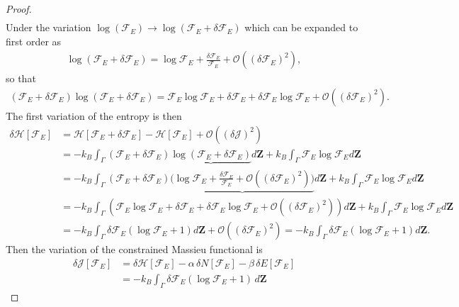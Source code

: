 \documentclass[12pt,a4paper]{article}
\numberwithin{equation}{section}
\begin{document}
\begin{proof}
\begin{align}
\end{align}
Under the variation $\log (\mathcal{F}_{E})\to\log(\mathcal{F}_{E}+\delta \mathcal{F}_{E})$ which can be expanded to first order as
\begin{align}
  \log(\mathcal{F}_{E}+\delta \mathcal{F}_{E})=\log \mathcal{F}_{E}+ \frac{\delta \mathcal{F}_{E}}{\mathcal{F}_{E}}+\mathcal{O}((\delta \mathcal{F}_{E})^{2}),
\end{align}
so that
\begin{align}
(\mathcal{F}_{E}+\delta \mathcal{F}_{E})\log(\mathcal{F}_{E}+\delta \mathcal{F}_{E})=\mathcal{F}_{E}\log \mathcal{F}_{E}+\delta \mathcal{F}_{E}+\delta \mathcal{F}_{E}\log \mathcal{F}_{E}+\mathcal{O}((\delta \mathcal{F}_{E})^{2}).
\end{align}
The first variation of the entropy is then
\begin{align}
\delta \mathcal{H}[\mathcal{F}_{E}]&=\mathcal{H}[\mathcal{F}_{E}+\delta \mathcal{F}_{E}]-\mathcal{H}[\mathcal{F}_{E}]+\mathcal{O}((\delta \mathcal{J})^{2})\nonumber\\&
=-k_{B}\int_{\Gamma}(\mathcal{F}_{E}+\delta \mathcal{F}_{E})\underbrace{\log(\mathcal{F}_{E}+\delta \mathcal{F}_{E})}d\mathbf{Z}+k_{B}\int_{\Gamma}\mathcal{F}_{E}\log \mathcal{F}_{E}d\mathbf{Z}\nonumber\\&
=-k_{B}\int_{\Gamma}(\mathcal{F}_{E}+\delta \mathcal{F}_{E})\underbrace{\bigg(\log \mathcal{F}_{E}+\frac{\delta \mathcal{F}_{E}}{\mathcal{F}_{E}}+\mathcal{O}((\delta \mathcal{F}_{E})^{2})\bigg)}d\mathbf{Z}+k_{B}\int_{\Gamma}\mathcal{F}_{E}\log \mathcal{F}_{E}d\mathbf{Z}\nonumber\\&
=-k_{B}\int_{\Gamma}\left(\mathcal{F}_{E}\log \mathcal{F}_{E}+\delta \mathcal{F}_{E}+\delta\mathcal{F}_{E}\log \mathcal{F}_{E}+\mathcal{O}((\delta \mathcal{F}_{E})^{2})\right)d\mathbf{Z}
+k_{B}\int_{\Gamma}\mathcal{F}_{E}\log \mathcal{F}_{E}d\mathbf{Z}\nonumber\\&
=-k_{B}\int_{\Gamma}\delta \mathcal{F}_{E}(\log\mathcal{F}_{E}+1)d\mathbf{Z}+\mathcal{O}((\delta \mathcal{F}_{E})^{2})=-k_{B}\int_{\Gamma}\delta \mathcal{F}_{E}(\log\mathcal{F}_{E}+1)d\mathbf{Z}.
\end{align}
Then the variation of the constrained Massieu functional is
\begin{align}
\delta \mathcal{J}[\mathcal{F}_{E}]
&= \delta \mathcal{H}[\mathcal{F}_{E}] - \alpha\,\delta N[\mathcal{F}_{E}] - \beta\, \delta E[\mathcal{F}_{E}] \nonumber\\
&= -k_{B}\!\int_{\Gamma}\! \delta \mathcal{F}_{E}(\log \mathcal{F}_{E} + 1)\, d\mathbf{Z}

\end{align}
\end{proof}
\end{document}
